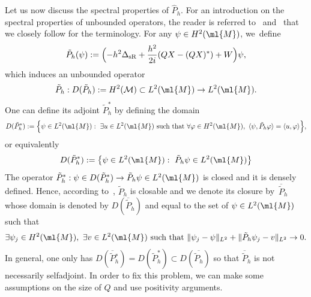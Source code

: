 \documentclass[10pt]{amsart}
\theoremstyle{plain}
\theoremstyle{definition}
\theoremstyle{remark}
\begin{document}
Let us now discuss the spectral properties of $\widehat{P}_h$. For an introduction on the spectral properties of unbounded operators, the reader is referred to~\cite[Ch.\,VIII]{ReedSimon80} and~\cite[Ch.\,X]{ReedSimon75} that we closely follow for the terminology. For any $\psi\in H^2(\ml{M})$, we~define
\[
\tilde{P}_h(\psi):=\Bigl(-h^2\Delta_{\text{sR}}+\frac{h^2}{2i}(QX-(QX)^*)+W\Bigr)\psi,
\]
which induces an unbounded operator
\[
\tilde{P}_h:D(\tilde{P}_h):=H^2(\mathcal{M})\subset L^2(\ml{M})\to L^2(\ml{M}).
\]
One can define its adjoint $\tilde{P}_h^*$ by defining the domain
\[
D(\tilde{P}_h^*):=\Bigl\{\psi\in L^2(\ml{M}):\ \exists u\in L^2(\ml{M})\ \text{such that}\ \forall \varphi\in H^2(\ml{M}),\ \langle\psi,\tilde{P}_h\varphi\rangle=\langle u,\varphi\rangle\Bigr\},
\]
or equivalently
\[
D(\tilde{P}_h^*):=\bigl\{\psi\in L^2(\ml{M}):\ \tilde{P}_h\psi\in L^2(\ml{M})\bigr\}
\]
The operator $\tilde{P}_h^*:\psi\in D(\tilde{P}_h^*)\to \tilde{P}_h\psi \in L^2(\ml{M})$ is closed and it is densely defined. Hence, according to~\cite[Th.\,VIII.1]{ReedSimon80}, $\tilde{P}_h$ is closable and we denote its closure by~$\overline{\tilde{P}}_h$ whose domain is denoted by $D(\overline{\tilde{P}}_h)$ and equal to the set of $\psi\in L^2(\ml{M})$ such that
\[
\exists \psi_j\in H^2(\ml{M}),\ \exists v\in L^2(\ml{M})\ \text{such that}\ \|\psi_j-\psi\|_{L^2}+\|\tilde{P}_h\psi_j-v\|_{L^2}\to 0.
\]
In general, one only has $D(\overline{\tilde{P}}{}_h^*)= D(\tilde{P}_h^*)\subset D(\overline{\tilde{P}_h})$ so that $\overline{\tilde{P}}_h$ is not necessarily selfadjoint. In order to fix this problem, we can make some assumptions on the size of $Q$ and use positivity arguments.
\end{document}
